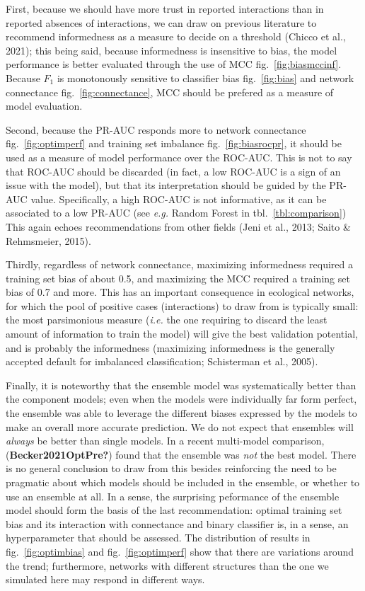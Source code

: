 \documentclass[11pt]{article}
\begin{document}
First, because we should have more trust in reported interactions than
in reported absences of interactions, we can draw on previous literature
to recommend informedness as a measure to decide on a threshold (Chicco
et al., 2021); this being said, because informedness is insensitive to
bias, the model performance is better evaluated through the use of MCC
fig.~\ref{fig:biasmccinf}. Because \(F_1\) is monotonously sensitive to
classifier bias fig.~\ref{fig:bias} and network connectance
fig.~\ref{fig:connectance}, MCC should be prefered as a measure of model
evaluation.

Second, because the PR-AUC responds more to network connectance
fig.~\ref{fig:optimperf} and training set imbalance
fig.~\ref{fig:biasrocpr}, it should be used as a measure of model
performance over the ROC-AUC. This is not to say that ROC-AUC should be
discarded (in fact, a low ROC-AUC is a sign of an issue with the model),
but that its interpretation should be guided by the PR-AUC value.
Specifically, a high ROC-AUC is not informative, as it can be associated
to a low PR-AUC (see \emph{e.g.} Random Forest in
tbl.~\ref{tbl:comparison}) This again echoes recommendations from other
fields (Jeni et al., 2013; Saito \& Rehmsmeier, 2015).

Thirdly, regardless of network connectance, maximizing informedness
required a training set bias of about 0.5, and maximizing the MCC
required a training set bias of 0.7 and more. This has an important
consequence in ecological networks, for which the pool of positive cases
(interactions) to draw from is typically small: the most parsimonious
measure (\emph{i.e.} the one requiring to discard the least amount of
information to train the model) will give the best validation potential,
and is probably the informedness (maximizing informedness is the
generally accepted default for imbalanced classification; Schisterman et
al., 2005).

Finally, it is noteworthy that the ensemble model was systematically
better than the component models; even when the models were individually
far form perfect, the ensemble was able to leverage the different biases
expressed by the models to make an overall more accurate prediction. We
do not expect that ensembles will \emph{always} be better than single
models. In a recent multi-model comparison, (\textbf{Becker2021OptPre?})
found that the ensemble was \emph{not} the best model. There is no
general conclusion to draw from this besides reinforcing the need to be
pragmatic about which models should be included in the ensemble, or
whether to use an ensemble at all. In a sense, the surprising peformance
of the ensemble model should form the basis of the last recommendation:
optimal training set bias and its interaction with connectance and
binary classifier is, in a sense, an hyperparameter that should be
assessed. The distribution of results in fig.~\ref{fig:optimbias} and
fig.~\ref{fig:optimperf} show that there are variations around the
trend; furthermore, networks with different structures than the one we
simulated here may respond in different ways.
\end{document}
